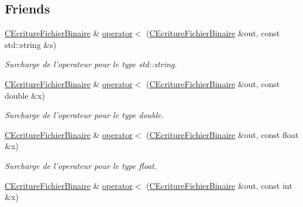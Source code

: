\subsection*{Friends}
\begin{DoxyCompactItemize}
\item 
\hypertarget{class_c_ecriture_fichier_binaire_a2c88c30ff08c7d9035596e0187d44e45}{\hyperlink{class_c_ecriture_fichier_binaire}{C\-Ecriture\-Fichier\-Binaire} \& \hyperlink{class_c_ecriture_fichier_binaire_a2c88c30ff08c7d9035596e0187d44e45}{operator$<$} (\hyperlink{class_c_ecriture_fichier_binaire}{C\-Ecriture\-Fichier\-Binaire} \&out, const std\-::string \&s)}\label{class_c_ecriture_fichier_binaire_a2c88c30ff08c7d9035596e0187d44e45}

\begin{DoxyCompactList}\small\item\em Surcharge de l'operateur pour le type {\itshape std\-::string}. \end{DoxyCompactList}\item 
\hypertarget{class_c_ecriture_fichier_binaire_afcaa555d19b37490df9fda731cf8cb19}{\hyperlink{class_c_ecriture_fichier_binaire}{C\-Ecriture\-Fichier\-Binaire} \& \hyperlink{class_c_ecriture_fichier_binaire_afcaa555d19b37490df9fda731cf8cb19}{operator$<$} (\hyperlink{class_c_ecriture_fichier_binaire}{C\-Ecriture\-Fichier\-Binaire} \&out, const double \&x)}\label{class_c_ecriture_fichier_binaire_afcaa555d19b37490df9fda731cf8cb19}

\begin{DoxyCompactList}\small\item\em Surcharge de l'operateur pour le type {\itshape double}. \end{DoxyCompactList}\item 
\hypertarget{class_c_ecriture_fichier_binaire_a68e43a125ee6c25828485dfb7270fdea}{\hyperlink{class_c_ecriture_fichier_binaire}{C\-Ecriture\-Fichier\-Binaire} \& \hyperlink{class_c_ecriture_fichier_binaire_a68e43a125ee6c25828485dfb7270fdea}{operator$<$} (\hyperlink{class_c_ecriture_fichier_binaire}{C\-Ecriture\-Fichier\-Binaire} \&out, const float \&x)}\label{class_c_ecriture_fichier_binaire_a68e43a125ee6c25828485dfb7270fdea}

\begin{DoxyCompactList}\small\item\em Surcharge de l'operateur pour le type {\itshape float}. \end{DoxyCompactList}\item 
\hypertarget{class_c_ecriture_fichier_binaire_a57ac55aefec2f3dd683cef75c409944b}{\hyperlink{class_c_ecriture_fichier_binaire}{C\-Ecriture\-Fichier\-Binaire} \& \hyperlink{class_c_ecriture_fichier_binaire_a57ac55aefec2f3dd683cef75c409944b}{operator$<$} (\hyperlink{class_c_ecriture_fichier_binaire}{C\-Ecriture\-Fichier\-Binaire} \&out, const int \&x)}\label{class_c_ecriture_fichier_binaire_a57ac55aefec2f3dd683cef75c409944b}


\end{DoxyCompactItemize}
